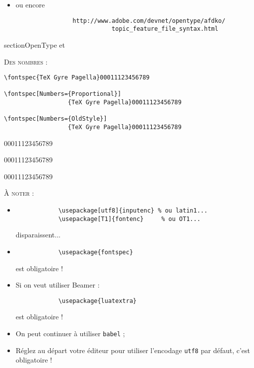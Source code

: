 \documentclass[12pt,a4paper,twocolumn]{book} %
\begin{document}
{\begin{itemize}
				\qquad\qquad\qquad\verb=List_of_typographic_features=
				\item<+-> ou encore \begin{verbatim}
				http://www.adobe.com/devnet/opentype/afdko/
				           topic_feature_file_syntax.html
				\end{verbatim}
			\end{itemize}
		
		
	section{OpenType et \LuaLaTeX}	
		
		
	{\textsc{Des nombres :}}
			\begin{verbatim}
\fontspec{TeX Gyre Pagella}00011123456789

\fontspec[Numbers={Proportional}]
                  {TeX Gyre Pagella}00011123456789

\fontspec[Numbers={OldStyle}]
                  {TeX Gyre Pagella}00011123456789
			\end{verbatim}	
		
		
		00011123456789
		
		00011123456789

00011123456789			
                  
                  
                  
                  
                  
 {\textsc{À noter :}}
\begin{itemize}
\item<+->	\begin{verbatim}
			\usepackage[utf8]{inputenc} % ou latin1...
			\usepackage[T1]{fontenc}     % ou OT1...
			\end{verbatim}
			disparaissent...
\item<+->	\begin{verbatim}
			\usepackage{fontspec}
			\end{verbatim}
			est obligatoire !
\item<+->	Si on veut utiliser Beamer :
			\begin{verbatim}
			\usepackage{luatextra}
			\end{verbatim}
			est obligatoire !
\item<+->	On peut continuer à utiliser \texttt{babel} ;
\item<+->	Réglez au départ votre éditeur pour utiliser l'encodage \texttt{utf8} par défaut, c'est obligatoire !
\end{itemize}                 
                  
}
\end{document}
